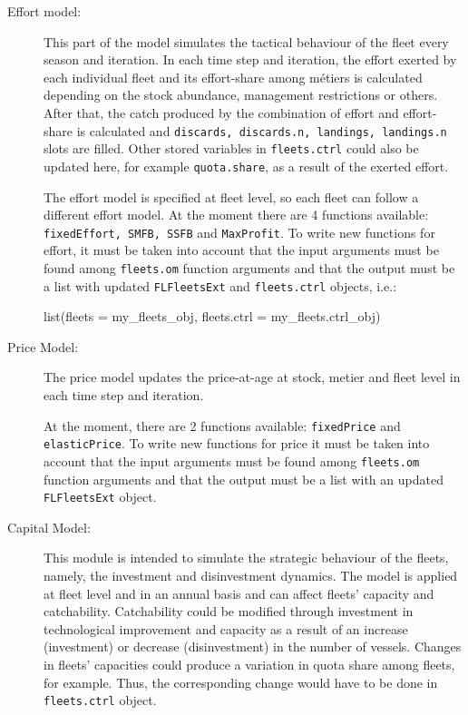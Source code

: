 \begin{description}
	\item[Effort model:] This part of the model simulates the tactical behaviour of the fleet every season and iteration.
	 In each time step and iteration, the effort exerted by each individual fleet and its effort-share among m\'etiers is 
	 calculated depending on the stock abundance, management restrictions or others. 
	 After that, the catch produced by the combination of effort and effort-share
	 is calculated and \texttt{discards, discards.n, landings, landings.n} slots are filled.
	 Other stored variables in \texttt{fleets.ctrl} could also be updated here, for example \texttt{quota.share},
	 as a result of the exerted effort. 
	 
	 The effort model is specified at fleet level, so each fleet can follow a different effort model.
	 At the moment there are 4 functions available: \texttt{fixedEffort, SMFB, SSFB} and \texttt{MaxProfit}. 
	 To write new functions for effort, it must be taken into account that the input arguments 
	 must be found among \texttt{fleets.om} function arguments and that the output must be a 
	 list with updated \texttt{FLFleetsExt} and \texttt{fleets.ctrl} objects, i.e.:
				
  \begin{Schunk}
    \begin{Sinput}
    list(fleets = my_fleets_obj, fleets.ctrl = my_fleets.ctrl_obj)
    \end{Sinput}
  \end{Schunk}	 	
		
			 	  
	\item[Price Model:] The price model updates the price-at-age at stock, metier and fleet level in each time
	step and iteration. 
	
	At the moment, there are 2 functions available: 
	\texttt{fixedPrice} and \texttt{elasticPrice}. 
	To write new functions for price it must be taken into account that the input arguments 
	must be found among \texttt{fleets.om} function arguments and that the output must be a 
	list with an updated \texttt{FLFleetsExt} object.
				
	\item[Capital Model:] This module is intended to simulate the strategic behaviour of the fleets, namely, the investment and disinvestment dynamics. 
	The model is applied at fleet level and in an annual basis and can affect fleets'  
	capacity and  catchability. Catchability could be modified through investment in technological improvement 
	and capacity as a result of an increase (investment) or decrease (disinvestment) in the number of vessels.  
	Changes in fleets' capacities could produce a variation in quota share among fleets, for example.
	Thus, the corresponding change would have to be done in \texttt{fleets.ctrl} object. 
	

\end{description}
